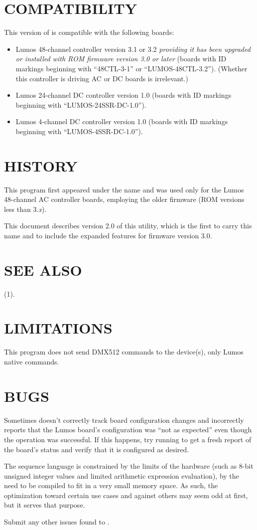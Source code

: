 \section*{COMPATIBILITY}


This version of 
is compatible with the following boards:
\begin{itemize}
\item
Lumos 48-channel controller version 3.1 or 3.2
\emph{providing it has been upgraded or installed with ROM firmware version 3.0 or later}
(boards with ID markings beginning with ``48CTL-3-1'' or ``LUMOS-48CTL-3.2'').  (Whether this controller is
driving AC or DC boards is irrelevant.)
\item
Lumos 24-channel DC controller version 1.0 (boards with ID markings beginning with
``LUMOS-24SSR-DC-1.0'').
\item
Lumos 4-channel DC controller version 1.0 (boards with ID markings beginning with
``LUMOS-4SSR-DC-1.0'').
\end{itemize}
\section*{HISTORY}



This program first appeared under the name
and was used only for the Lumos 48-channel AC controller boards, employing the
older firmware (ROM versions less than
3.\emph{x}).


This document describes version 2.0 of this utility, which is the first to carry
this name and to include the expanded features for firmware version 3.0.
\section*{SEE ALSO}
(1).
\section*{LIMITATIONS}


This program does not send DMX512 commands to the device(s), only Lumos native
commands.
\section*{BUGS}


Sometimes 
doesn't correctly track board configuration changes and incorrectly reports that 
the Lumos board's configuration was ``not as expected'' even though the operation
was successful.  If this happens, try running
to get a fresh report of the board's status and verify that it is configured as desired.


The sequence language is constrained by the limits of the hardware (such as 8-bit
unsigned integer values and limited arithmetic expression evaluation), 
by the need to 
be compiled to fit in a very small memory space.  As such, the optimization
toward certain use cases and against others may seem odd at first, but it serves that
purpose.


Submit any other issues found to 
.
